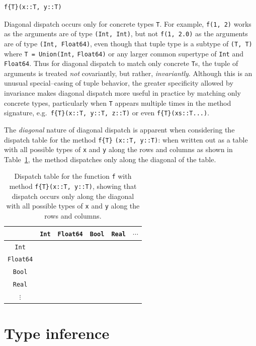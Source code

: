 \documentclass[pldi]{sigplanconf-pldi15}
\begin{document}
\begin{lstlisting}
f{T}(x::T, y::T)
\end{lstlisting}
%
Diagonal dispatch occurs only for concrete types \verb|T|. For example,
\verb|f(1, 2)| works as the arguments are of type \verb|(Int, Int)|, but not
\verb|f(1, 2.0)| as the arguments are of type \verb|(Int, Float64)|, even
though that tuple type is a subtype of \verb|(T, T)| where
\verb|T = Union(Int,| \verb|Float64)| or any larger common supertype of \verb|Int| and
\verb|Float64|. Thus for diagonal dispatch to match only concrete \verb|T|s,
the tuple of arguments is treated \textit{not} covariantly, but rather,
\textit{invariantly}. Although this is an unusual special--casing of tuple
behavior, the greater specificity allowed by invariance makes diagonal dispatch
more useful in practice by matching only concrete types, particularly when
\verb|T| appears multiple times in the method signature, e.g.\ 
\verb|f{T}(x::T, y::T, z::T)| or even \verb|f{T}(xs::T...)|. 

The \textit{diagonal} nature of diagonal dispatch is apparent when considering
the dispatch table for the method \verb|f{T}| \verb|(x::T, y::T)|: when written
out as a table with all possible types of \texttt{x} and \texttt{y} along the
rows and columns as shown in Table~\ref{tab:diagonal}, the method dispatches
only along the diagonal of the table.

\begin{table}
\begin{tabular}{c | c c c c c}
	& \verb|Int| & \verb|Float64| & \verb|Bool| & \verb|Real| & $\cdots$ \\ \hline
	\verb|Int|     & \checkmark &  &  &  & \\
	\verb|Float64| &  & \checkmark &  &  & \\
	\verb|Bool|    &  &  & \checkmark &  & \\
	\verb|Real|    &  &  &  &  & \\
	$\vdots$       &  &  &  &  &
\end{tabular}
\caption{Dispatch table for the function \texttt{f} with method
\texttt{f\{T\}(x::T, y::T)}, showing that dispatch occurs only along the
diagonal with all possible types of \texttt{x} and \texttt{y} along the rows
and columns.}
\label{tab:diagonal}
\end{table}


\section{Type inference}
\label{sec:inference}
\end{document}
